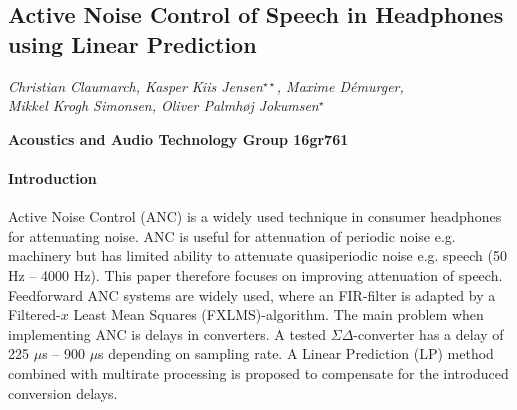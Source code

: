 \documentclass[a4paper]{article}
\title{}
\begin{document}
	
	{\centering
		\subsection*{Active Noise Control of Speech in Headphones using Linear Prediction}}
	
	{\centering
		\textit{Christian Claumarch, Kasper Kiis Jensen$^{\star \star}$, Maxime Démurger, \\Mikkel Krogh Simonsen, Oliver Palmhøj Jokumsen$^{\star}$}
		\par}
	{\centering
		\textbf{Acoustics and Audio Technology Group 16gr761}
		\par}
	
	\bigskip
	
	\paragraph{Introduction} 

	Active Noise Control (ANC) is a widely used technique in consumer headphones for attenuating noise. ANC is useful for attenuation of periodic noise e.g. machinery but has limited ability to attenuate quasiperiodic noise e.g. speech (50 Hz -- 4000 Hz). This paper therefore focuses on improving attenuation of speech. Feedforward ANC systems are widely used, where an FIR-filter is adapted by a Filtered-$x$ Least Mean Squares (FXLMS)-algorithm. The main problem when implementing ANC is delays in converters. A tested $\Sigma\Delta$-converter has a delay of 225 $\mu$s -- 900 $\mu$s depending on sampling rate. A Linear Prediction (LP) method combined with multirate processing is proposed to compensate for the introduced conversion delays.
\end{document}
